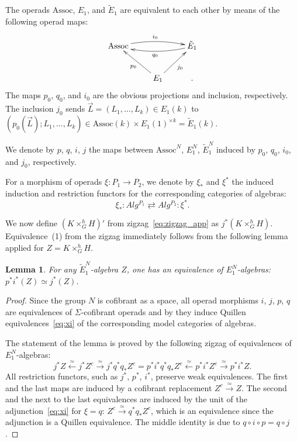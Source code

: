 \documentclass[11pt]{amsart}
\newtheorem{lemma}[theorem]{Lemma}
\theoremstyle{definition}
\newcommand{\Assoc}{\mathrm{Assoc}}
\numberwithin{equation}{section}
\begin{document}
The operads $\Assoc$, $E_1$, and $\tilde E_1$ are equivalent to each other by means of the following operad maps:
\[
\xymatrix{
\Assoc\ar@/^/[rr]^{i_0}&&\tilde E_1\ar@/^/[ll]^{q_0}\\
& E_1\ar[ul]^{p_0}\ar[ur]_{j_0}&.
}
\]
The maps $p_0$, $q_0$,  and $i_0$ are the obvious projections and inclusion, respectively. The inclusion $j_0$
sends $\vec L=(L_1,\ldots,L_k)\in E_1(k)$ to $\left(p_0(\vec L);L_1,\ldots,L_k\right)\in \Assoc(k)\times E_1(1)^{\times k}=
\tilde E_1(k)$.

We denote by $p$, $q$, $i$, $j$ the maps between $\Assoc^N$, $E_1^N$, $\tilde E_1^N$ induced by $p_0$, $q_0$, $i_0$,
and $j_0$, respectively.

For a morphism of operads $\xi\colon P_1\to P_2$, we denote by $\xi_*$ and $\xi^*$ the induced  induction and restriction
functors for the corresponding categories of algebras:
\begin{equation}\label{eq:xi}
\xi_*\colon Alg^{P_1}\rightleftarrows Alg^{P_2}\colon \xi^*.
\end{equation}

We now define $\left(K\times^h_G H\right)'$ from zigzag~\eqref{eq:zigzag_app} as $j^*\left(K\times^h_G H\right)$.
Equivalence~(1) from the zigzag immediately follows from the following lemma applied for $Z=K\times^h_G H$.

\begin{lemma}\label{l:equiv1}
For any $\tilde E_1^N$-algebra $Z$, one has an equivalence of $E_1^N$-algebras: $p^*i^*(Z)\simeq j^*(Z).$
\end{lemma}

\begin{proof}
Since the group $N$ is cofibrant as a space, all operad morphisms $i$, $j$, $p$, $q$ are equivalences of $\Sigma$-cofibrant operads
and by \cite[Theorem~4.4]{BM} they induce Quillen equivalences~\eqref{eq:xi} of the corresponding model categories of algebras.

The statement of the lemma is proved by the following zigzag of equivalences of $E_1^N$-algebras:
\begin{equation}\label{eq:z_a1}
j^*Z\xleftarrow{\simeq} j^*Z^c\xrightarrow{\simeq} %
 j^*q^*q_* Z^c
= p^*i^*q^*q_* Z^c\xleftarrow{\simeq} p^*i^*Z^c\xrightarrow{\simeq}p^*i^*Z.
\end{equation}
All restriction functors, such as $j^*$, $p^*$, $i^*$, preserve weak equivalences.
The first and the last maps are induced by a cofibrant replacement $Z^c\xrightarrow{\simeq} Z$.  The second and the next to the last 
equivalences are induced by the unit of the adjunction~\eqref{eq:xi} for $\xi=q$: $Z^c\xrightarrow{\simeq}q^*q_* Z^c$,
which is an equivalence since the adjunction is a Quillen equivalence. The middle identity is due to $q\circ i\circ p=q\circ j$.
\end{proof}
\end{document}
